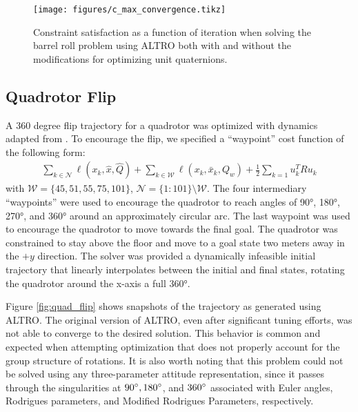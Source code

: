 \documentclass[letterpaper, 10 pt, conference]{ieeeconf}  %
\newcommand{\half}{\frac{1}{2}}
\begin{document}
        \begin{figure}[ht]
            \centering
            \texttt{[image: figures/c\_max\_convergence.tikz]}
            \caption{Constraint satisfaction as a function of iteration when solving the barrel roll problem using ALTRO both with and without the modifications for optimizing unit quaternions.}
            \label{fig:c_max_convergence}
        \end{figure}

    \subsection{Quadrotor Flip}
        A 360 degree flip trajectory for a quadrotor was optimized with dynamics adapted
        from \cite{mellinger2012trajectory}. To encourage the flip, we specified a 
        ``waypoint'' cost function of the following form:
        \begin{multline}
                  \sum_{k \in \mathcal{N}} \ell(x_k, \hat{x}, \hat{Q}) 
                + \sum_{k \in \mathcal{W}} \ell(x_k, \bar{x}_k, Q_w) 
                + \half \sum_{k=1} u_k^T R u_k
        \end{multline}
        with $\mathcal{W} = \{45,51,55,75,101\}$, $\mathcal{N} = \{1:101\} \setminus
        \mathcal{W}$. The four intermediary ``waypoints'' were used to encourage the
        quadrotor to reach angles of \ang{90}, \ang{180}, \ang{270}, and \ang{360} around
        an approximately circular arc. The last waypoint was used to encourage the
        quadrotor to move towards the final goal. The quadrotor was constrained to stay
        above the floor and move to a goal state two meters away in the $+y$ direction. The
        solver was provided a dynamically infeasible initial trajectory that linearly
        interpolates between the initial and final states, rotating the quadrotor around
        the x-axis a full \ang{360}.

	    Figure \ref{fig:quad_flip} shows snapshots of the trajectory as generated using
	    ALTRO. The original version of ALTRO, even after significant tuning efforts, was
        not able to converge to the desired solution. 
	    This behavior is common and expected when attempting optimization that does not
	    properly account for the group structure of rotations. It is also worth noting
	    that this problem could not be solved using any three-parameter attitude
	    representation, since it passes through the singularities at $90\degree,
	    180\degree$, and $360\degree$ associated with Euler angles, Rodrigues parameters,
	    and Modified Rodrigues Parameters, respectively.
\end{document}
